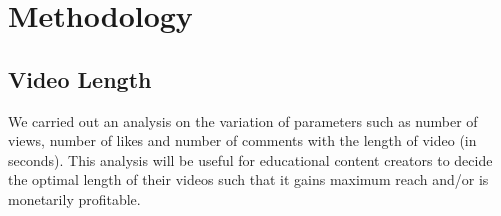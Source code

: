 \documentclass{article}
\begin{document}

    
    
    
\section{Methodology}
\subsection{Video Length}
We carried out an analysis on the variation  of parameters such as number of views, number of likes and number of comments with the length of video (in seconds). This analysis will be useful for educational content creators to decide the optimal length of their videos such that it gains maximum reach and/or is monetarily profitable.   
\end{document}
